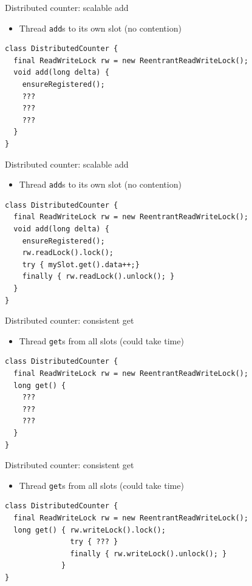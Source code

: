 \begin{frame}{Distributed counter: scalable add}

\begin{itemize}
    \item Thread \texttt{add}s to its own slot (no contention)    
\end{itemize}

\begin{verbatim}
class DistributedCounter {
  final ReadWriteLock rw = new ReentrantReadWriteLock();
  void add(long delta) {
    ensureRegistered();
    ???
    ???
    ???
  }
}
\end{verbatim}
\end{frame}

\begin{frame}{Distributed counter: scalable add}

\begin{itemize}
    \item Thread \texttt{add}s to its own slot (no contention)    
\end{itemize}

\begin{verbatim}
class DistributedCounter {
  final ReadWriteLock rw = new ReentrantReadWriteLock();
  void add(long delta) {
    ensureRegistered();
    rw.readLock().lock();
    try { mySlot.get().data++;} 
    finally { rw.readLock().unlock(); }
  }
}
\end{verbatim}
\end{frame}

\begin{frame}{Distributed counter: consistent get}

\begin{itemize}
    \item Thread \texttt{get}s from all slots (could take time)
\end{itemize}

\begin{verbatim}
class DistributedCounter {
  final ReadWriteLock rw = new ReentrantReadWriteLock();
  long get() {
    ???
    ???
    ???
  }
}
\end{verbatim}
\end{frame}


\begin{frame}{Distributed counter: consistent get}

\begin{itemize}
    \item Thread \texttt{get}s from all slots (could take time)
\end{itemize}

\begin{verbatim}
class DistributedCounter {
  final ReadWriteLock rw = new ReentrantReadWriteLock();
  long get() { rw.writeLock().lock();
               try { ??? } 
               finally { rw.writeLock().unlock(); }
             }
}
\end{verbatim}
\end{frame}

